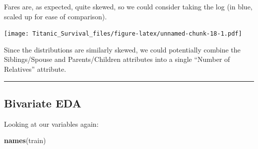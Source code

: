 \documentclass[]{article}
\newenvironment{Shaded}{\begin{snugshade}}{\end{snugshade}}
\newcommand{\KeywordTok}[1]{\textcolor[rgb]{0.13,0.29,0.53}{\textbf{#1}}}
\newcommand{\DataTypeTok}[1]{\textcolor[rgb]{0.13,0.29,0.53}{#1}}
\newcommand{\DecValTok}[1]{\textcolor[rgb]{0.00,0.00,0.81}{#1}}
\newcommand{\FloatTok}[1]{\textcolor[rgb]{0.00,0.00,0.81}{#1}}
\newcommand{\StringTok}[1]{\textcolor[rgb]{0.31,0.60,0.02}{#1}}
\newcommand{\OtherTok}[1]{\textcolor[rgb]{0.56,0.35,0.01}{#1}}
\newcommand{\OperatorTok}[1]{\textcolor[rgb]{0.81,0.36,0.00}{\textbf{#1}}}
\newcommand{\NormalTok}[1]{#1}
\begin{document}
Fares are, as expected, quite skewed, so we could consider taking the
log (in blue, scaled up for ease of comparison).

\begin{Shaded}
\end{Shaded}

\texttt{[image: Titanic\_Survival\_files/figure-latex/unnamed-chunk-18-1.pdf]}

Since the distributions are similarly skewed, we could potentially
combine the Siblings/Spouse and Parents/Children attributes into a
single ``Number of Relatives'' attribute.

\begin{center}\rule{0.5\linewidth}{\linethickness}\end{center}

\subsection{Bivariate EDA}\label{bivariate-eda}

Looking at our variables again:

\begin{Shaded}
\begin{Highlighting}[]
\KeywordTok{names}\NormalTok{(train)}
\end{Highlighting}
\end{Shaded}
\end{document}
